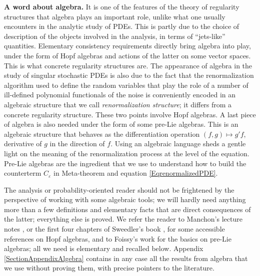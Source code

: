 \documentclass[10pt, reqno]{amsart}
\numberwithin{subsection}{section}
\numberwithin{subsubsection}{subsection}
\numberwithin{equation}{section} %
\theoremstyle{mystyle}
\theoremstyle{mystyle2}
\theoremstyle{mystyle3}
\renewcommand{\epsilon}{\varepsilon}
\begin{document}
\noindent \textbf{\textsf{A word about algebra.}} It is one of the features of the theory of regularity structures that algebra plays an important role, unlike what one usually encounters in the analytic study of PDEs. This is partly due to the choice of description of the objects involved in the analysis, in terms of ``jets-like'' quantities. Elementary consistency requirements directly bring algebra into play, under the form of Hopf algebras and actions of the latter on some vector spaces. This is what concrete regularity structures are. The appearance of algebra in the study of singular stochastic PDEs is also due to the fact that the renormalization algorithm used to define the random variables that play the role of a number of ill-defined polynomial functionals of the noise is conveniently encoded in an algebraic structure that we call \textit{renormalization structure}; it differs from a concrete regularity structure. These two points involve Hopf algebras. A last piece of algebra is also needed under the form of some pre-Lie algebras. This is an algebraic structure that behaves as the differentiation operation $(f,g)\mapsto g'f$, derivative of $g$ in the direction of $f$. Using an algebraic language sheds a gentle light on the meaning of the renormalization process at the level of the equation. Pre-Lie algebras are the ingredient that we use to understand how to build the counterterm $C_\epsilon$ in Meta-theorem {} and equation \eqref{EqrenormalizedPDE}. 

The analysis or probability-oriented reader should not be frightened by the perspective of working with some algebraic tools; we will hardly need anything more than a few definitions and elementary facts that are direct consequences of the latter; everything else is proved. We refer the reader to Manchon's lecture notes \cite{Manchon}, or the first four chapters of Sweedler's book \cite{Sweedler}, for some accessible references on Hopf algebras, and to Foissy's work \cite{FoissyTypedTrees} for the basics on pre-Lie algebras; all we need is elementary and recalled below. Appendix {\sf \ref{SectionAppendixAlgebra}} contains in any case all the results from algebra that we use without proving them, with precise pointers to the literature.

\medskip
\end{document}
